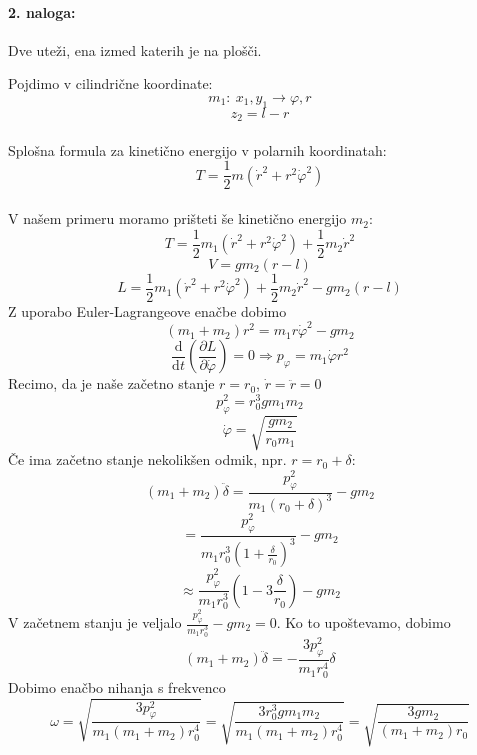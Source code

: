 \documentclass[a4paper]{article}
\newcommand{\pd}[2]{\frac{\partial {#1}}{\partial {#2}}}
\newcommand{\dd}[2]{\frac{\mathrm{d} {#1}}{\mathrm{d} {#2}}}
\begin{document}
\paragraph{2. naloga:} Dve uteži, ena izmed katerih je na plošči.
\begin{figure}[h!]
    \centering
\end{figure}
\newline
Pojdimo v cilindrične koordinate:
$$m_1:~x_1, y_1 \rightarrow \varphi, r$$
$$z_2 = l-r$$
\\
Splošna formula za kinetično energijo v polarnih koordinatah:
$$T = \frac{1}{2}m\left(\dot{r}^2 + r^2\dot{\varphi}^2\right)$$
\\
V našem primeru moramo prišteti še kinetično energijo $m_2$:
$$T = \frac{1}{2}m_1\left(\dot{r}^2 + r^2\dot{\varphi}^2\right) + \frac{1}{2}m_2\dot{r}^2$$
$$V = gm_2(r-l)$$
$$L = \frac{1}{2}m_1(\dot{r}^2 + r^2\dot{\varphi}^2) + \frac{1}{2}m_2\dot{r}^2 - gm_2(r-l)$$
Z uporabo Euler-Lagrangeove enačbe dobimo
$$(m_1 + m_2)r^2 = m_1r\dot{\varphi}^2 - gm_2$$
$$\dd{}{t} \left(\pd{L}{\dot{\varphi}}\right) = 0 \Rightarrow p_\varphi = m_1\dot{\varphi}r^2$$
Recimo, da je naše začetno stanje $r = r_0$, $\dot{r} = \ddot{r} = 0$
$$p_\varphi^2 = r_0^3gm_1m_2$$
$$\dot\varphi = \sqrt{\frac{gm_2}{r_0m_1}}$$
Če ima začetno stanje nekolikšen odmik, npr. $r = r_0 + \delta$:
$$(m_1 + m_2)\ddot{\delta} = \frac{p_\varphi^2}{m_1(r_0 + \delta)^3} - gm_2$$
$$= \frac{p_\varphi^2}{m_1r_0^3\left(1 + \frac{\delta}{r_0}\right)^3} - gm_2$$
$$\approx \frac{p_\varphi^2}{m_1r_0^3}\left(1 - 3\frac{\delta}{r_0}\right) - gm_2$$
V začetnem stanju je veljalo $\displaystyle{\frac{p_\varphi^2}{m_1r_0^3}-gm_2 = 0}$. Ko to upoštevamo, dobimo
$$(m_1 + m_2)\ddot{\delta} = -\frac{3p_\varphi^2}{m_1r_0^4}\delta$$
Dobimo enačbo nihanja s frekvenco
$$\omega = \sqrt{\frac{3p_\varphi^2}{m_1(m_1 + m_2)r_0^4}} = \sqrt{\frac{3r_0^3gm_1m_2}{m_1(m_1 + m_2)r_0^4}} = \sqrt{\frac{3gm_2}{(m_1 + m_2)r_0}}$$
\end{document}
